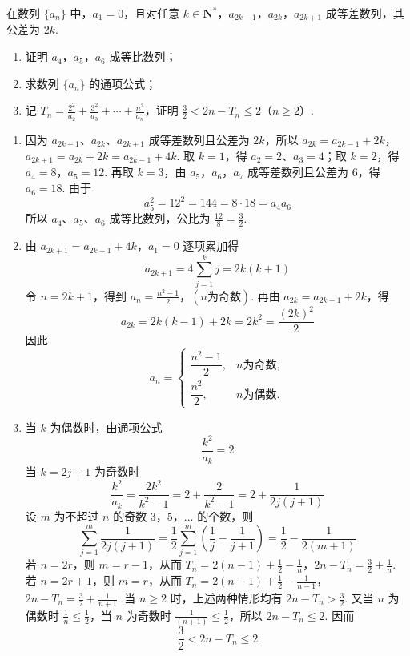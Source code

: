 \begin{problem}
在数列 \(\{a_n\}\) 中，\(a_1 = 0\)，且对任意 \(k \in \mathbf{N}^{*}\)，\(a_{2k-1}\)，\(a_{2k}\)，\(a_{2k+1}\) 成等差数列，其公差为 \(2k\).

\begin{enumerate}
\item 证明 \(a_4\)，\(a_5\)，\(a_6\) 成等比数列；
\item 求数列 \(\{a_n\}\) 的通项公式；
\item 记 \(T_n = \frac{2^2}{a_2} + \frac{3^2}{a_3} + \cdots + \frac{n^2}{a_n}\)，证明 \(\frac{3}{2} < 2n - T_n \leqslant 2\)（\(n \geqslant 2\)）.
\end{enumerate}
\end{problem}

\begin{solution}
\begin{enumerate}
\item 因为 \(a_{2k-1}\)、\(a_{2k}\)、\(a_{2k+1}\) 成等差数列且公差为 \(2k\)，所以
\(a_{2k}=a_{2k-1}+2k\)，\(a_{2k+1}=a_{2k}+2k=a_{2k-1}+4k\).
取 \(k=1\)，得 \(a_2=2\)、\(a_3=4\)；取 \(k=2\)，得
\(a_4=8\)，\(a_5=12\).
再取 \(k=3\)，由 \(a_5\)，\(a_6\)，\(a_7\) 成等差数列且公差为 \(6\)，得 \(a_6=18\).
由于
\[
a_5^2=12^2=144=8\cdot18=a_4a_6
\]
所以 \(a_4\)、\(a_5\)、\(a_6\) 成等比数列，公比为 \(\frac{12}{8}=\frac{3}{2}\).

\item 由
\(a_{2k+1}=a_{2k-1}+4k\)，\(a_1=0\)
逐项累加得
\[
a_{2k+1}=4\sum_{j=1}^{k}j=2k(k+1)
\]
令 \(n=2k+1\)，得到
\(a_n=\frac{n^2-1}{2}\)，\((n\text{为奇数})\).
再由 \(a_{2k}=a_{2k-1}+2k\)，得
\[
a_{2k}=2k(k-1)+2k=2k^2=\frac{(2k)^2}{2}
\]
因此
\[
a_n=\begin{cases}
\dfrac{n^2-1}{2},&n\text{为奇数},\\[4pt]
\dfrac{n^2}{2},&n\text{为偶数}.
\end{cases}
\]

\item 当 \(k\) 为偶数时，由通项公式
\[
\frac{k^2}{a_k}=2
\]
当 \(k=2j+1\) 为奇数时
\[
\frac{k^2}{a_k}
=\frac{2k^2}{k^2-1}
=2+\frac{2}{k^2-1}
=2+\frac{1}{2j(j+1)}
\]
设 \(m\) 为不超过 \(n\) 的奇数 \(3\)，\(5\)，\(\ldots\) 的个数，则
\[
\sum_{j=1}^{m}\frac{1}{2j(j+1)}
=\frac12\sum_{j=1}^{m}\left(\frac1j-\frac1{j+1}\right)
=\frac12-\frac{1}{2(m+1)}
\]
若 \(n=2r\)，则 \(m=r-1\)，从而
\(T_n=2(n-1)+\frac12-\frac1n\)，\(2n-T_n=\frac32+\frac1n\).
若 \(n=2r+1\)，则 \(m=r\)，从而
\(T_n=2(n-1)+\frac12-\frac1{n+1}\)，\(2n-T_n=\frac32+\frac1{n+1}\).
当 \(n\geqslant2\) 时，上述两种情形均有 \(2n-T_n>\frac32\). 又当 \(n\) 为偶数时 \(\frac{1}{n}\leqslant\frac{1}{2}\)，当 \(n\) 为奇数时 \(\frac{1}{(n+1)}\leqslant\frac{1}{2}\)，所以 \(2n-T_n\leqslant2\). 因而
\[
\frac32<2n-T_n\leqslant2
\]
\end{enumerate}
\end{solution}
